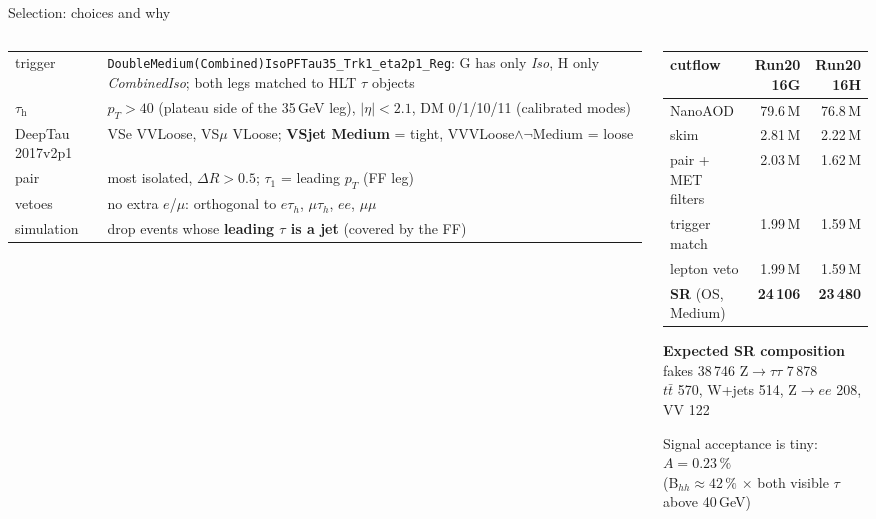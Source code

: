 \documentclass[aspectratio=169,9pt]{beamer}
\newcommand{\tauh}{\ensuremath{\tau_\mathrm{h}}}
\begin{document}
\begin{frame}{Selection: choices and why}
\begin{columns}[T]
\begin{column}{0.58\textwidth}
\footnotesize
\begin{tabular}{@{}p{2.2cm}p{5.6cm}@{}}
\toprule
trigger & \texttt{DoubleMedium(Combined)IsoPFTau35\_Trk1\_eta2p1\_Reg}: G has only \emph{Iso}, H only \emph{CombinedIso}; both legs matched to HLT $\tau$ objects \\
\tauh{} & $p_T>40$ (plateau side of the 35\,GeV leg), $|\eta|<2.1$, DM 0/1/10/11 (calibrated modes) \\
DeepTau 2017v2p1 & VSe VVLoose, VS$\mu$ VLoose; \textbf{VSjet Medium} = tight, VVVLoose$\wedge\neg$Medium = loose \\
pair & most isolated, $\Delta R>0.5$; $\tau_1$ = leading $p_T$ (FF leg) \\
vetoes & no extra $e$/$\mu$: orthogonal to $e\tau_h$, $\mu\tau_h$, $ee$, $\mu\mu$ \\
simulation & drop events whose \textbf{leading $\tau$ is a jet} (covered by the FF) \\
\bottomrule
\end{tabular}
\end{column}
\begin{column}{0.40\textwidth}
\footnotesize
\begin{tabular}{@{}lrr@{}}
\toprule
cutflow & Run2016G & Run2016H \\
\midrule
NanoAOD & 79.6\,M & 76.8\,M \\
skim & 2.81\,M & 2.22\,M \\
pair + MET filters & 2.03\,M & 1.62\,M \\
trigger match & 1.99\,M & 1.59\,M \\
lepton veto & 1.99\,M & 1.59\,M \\
\textbf{SR} (OS, Medium) & \textbf{24\,106} & \textbf{23\,480} \\
\bottomrule
\end{tabular}

\medskip
\textbf{Expected SR composition}\\
fakes 38\,746 \quad Z$\rightarrow\tau\tau$ 7\,878\\
$t\bar t$ 570, W+jets 514, Z$\rightarrow ee$ 208, VV 122

\medskip
\alert{Signal acceptance is tiny:} $A = 0.23\,\%$\\ (B$_{hh}\approx42\,\%$ $\times$ both visible $\tau$ above 40\,GeV)
\end{column}
\end{columns}
\end{frame}
\end{document}
